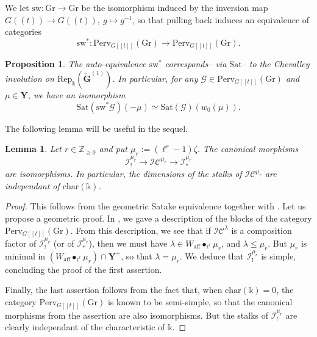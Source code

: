 \documentclass[11pt]{amsart}
\theoremstyle{plain}
\newtheorem{lem}[thm]{Lemma}
\newtheorem{prop}[thm]{Proposition}
\theoremstyle{remark}
\numberwithin{equation}{section}
\begin{document}
  We let $\mathrm{sw}:\mathrm{Gr}\to\mathrm{Gr}$ be the isomorphism induced by the inversion map $G((t))\to G((t)),~g\mapsto g^{-1}$, so that pulling back induces an equivalence of categories $$\mathrm{sw}^*:\mathrm{Perv}_{G[[t]]}(\mathrm{Gr})\to \mathrm{Perv}_{G[[t]]}(\mathrm{Gr}).$$
  \begin{prop}{{\cite[VI.12.1]{fargues2024geometrization}}}\label{prop Chevalley inv}
      The auto-equivalence $\mathrm{sw}^*$ corresponds-- via $\mathrm{Sat}$-- to the Chevalley involution on  $\mathrm{Rep}_\mathbb{k}(\check{\mathbf{G}}^{(1)})$. In particular, for any $\mathcal{G}\in \mathrm{Perv}_{G[[t]]}(\mathrm{Gr})$ and $\mu\in\mathbf{Y}$, we have an isomorphism
      $$\mathrm{Sat}(\mathrm{sw}^*\mathcal{G})(-\mu)\simeq \mathrm{Sat}(\mathcal{G})(w_0(\mu)). $$
  \end{prop}

 The following lemma will be useful in the sequel.
 \begin{lem}\label{lem Steinberg weights}
     Let $r\in\mathbb{Z}_{\geq0}$ and put $\mu_r:=(\ell^r-1)\zeta$. The canonical morphisms
  $$\mathcal{I}^{\mu_r}_!\to\mathcal{IC}^{\mu_r} \to\mathcal{I}^{\mu_r}_*$$
  are isomorphisms. In particular, the dimensions of the stalks of $\mathcal{IC}^{\mu_r}$ are independant of $\mathrm{char}(\mathbb{k})$.
 \end{lem}
 \begin{proof}This follows from the geometric Satake equivalence together with \cite[II.3.19, (4)]{jantzen2003representations}. Let us propose a geometric proof. In \cite{zabeth2022block}, we gave a description of the blocks of the category $\mathrm{Perv}_{G[[t]]}(\mathrm{Gr})$. From this description, we see that if $\mathcal{IC}^\lambda$ is a composition factor of $\mathcal{I}^{\mu_r}_!$ (or of $\mathcal{I}^{\mu_r}_*$), then we must have $\lambda\in W_{\mathrm{aff}}\bullet_{\ell^r}\mu_r$, and $\lambda\leq\mu_r$. But $\mu_r$ is minimal in $(W_{\mathrm{aff}}\bullet_{\ell^r}\mu_r)\cap\mathbf{Y}^+$, so that $\lambda=\mu_r$. We deduce that $\mathcal{I}^{\mu_r}_!$ is simple, concluding the proof of the first assertion.

 Finally, the last assertion follows from the fact that, when $\mathrm{char}(\mathbb{k})=0$, the category $\mathrm{Perv}_{G[[t]]}(\mathrm{Gr})$ is known to be semi-simple, so that the canonical morphisms from the assertion are also isomorphisms. But the stalks of $\mathcal{I}^{\mu_r}_!$ are clearly independant of the characteristic of $\mathbb{k}$.
 \end{proof}
	
\end{document}
